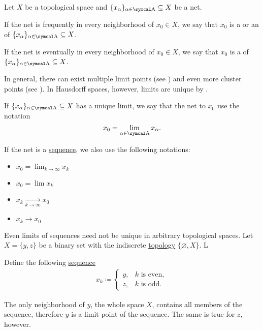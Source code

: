 \begin{definition}\label{def:net_convergence}
  Let \( X \) be a topological space and \( \{ x_\al \}_{\al \in \CA} \subseteq X \) be a net.

  \begin{defenum}
     If the net is frequently in every neighborhood of \( x_0 \in X \), we say that \( x_0 \) is a  or an  of \( \{ x_\al \}_{\al \in \CA} \subseteq X \).

     If the net is eventually in every neighborhood of \( x_0 \in X \), we say that \( x_0 \) is a  of \( \{ x_\al \}_{\al \in \CA} \subseteq X \).
  \end{defenum}

  In general, there can exist multiple limit points (see ) and even more cluster points (see ). In Hausdorff spaces, however, limits are unique by .

  If \( \{ x_\al \}_{\al \in \CA} \subseteq X \) has a unique limit, we say that the net  to \( x_0 \) use the notation
  \begin{equation*}
    x_0 = \lim_{\al \in \CA} x_\al.
  \end{equation*}

  If the net is a \hyperref[def:sequence]{sequence}, we also use the following notations:
  \begin{itemize}
    \item \( x_0 = \lim_{k \to \infty} x_k \)
    \item \( x_0 = \lim x_k \)
    \item \( x_k \xrightarrow[k \to \infty]{} x_0 \)
    \item \( x_k \to x_0 \)
  \end{itemize}
\end{definition}

\begin{example}\label{ex:multiple_limit_points_of_net}
  Even limits of sequences need not be unique in arbitrary topological spaces. Let \( X = \{ y, z \} \) be a binary set with the indiscrete \hyperref[def:standard_topologies/indiscrete]{topology} \( \{ \varnothing, X \} \). L

  Define the following \hyperref[def:sequence]{sequence}
  \begin{align*}
    x_k \coloneqq \begin{cases}
      y, &k \text{ is even}, \\
      z, &k \text{ is odd}.
    \end{cases}
  \end{align*}

  The only neighborhood of \( y \), the whole space \( X \), contains all members of the sequence, therefore \( y \) is a limit point of the sequence. The same is true for \( z \), however.
\end{example}

